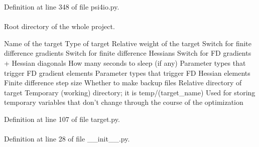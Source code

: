\-Definition at line 348 of file psi4io.\-py.

\hypertarget{classforcebalance_1_1target_1_1Target_aede2856573b890cd47054ad36937d6f6}{
\paragraph[{tempdir}]{}}\label{classforcebalance_1_1target_1_1Target_aede2856573b890cd47054ad36937d6f6}


\-Root directory of the whole project. 

\-Name of the target \-Type of target \-Relative weight of the target \-Switch for finite difference gradients \-Switch for finite difference \-Hessians \-Switch for \-F\-D gradients + \-Hessian diagonals \-How many seconds to sleep (if any) \-Parameter types that trigger \-F\-D gradient elements \-Parameter types that trigger \-F\-D \-Hessian elements \-Finite difference step size \-Whether to make backup files \-Relative directory of target \-Temporary (working) directory; it is temp/(target\-\_\-name) \-Used for storing temporary variables that don't change through the course of the optimization 

\-Definition at line 107 of file target.\-py.

\hypertarget{classforcebalance_1_1BaseClass_afd68efa29ccd2f320f4cf82198214aac}{
\paragraph[{verbose\-\_\-options}]{}}\label{classforcebalance_1_1BaseClass_afd68efa29ccd2f320f4cf82198214aac}


\-Definition at line 28 of file \-\_\-\-\_\-init\-\_\-\-\_\-.\-py.

